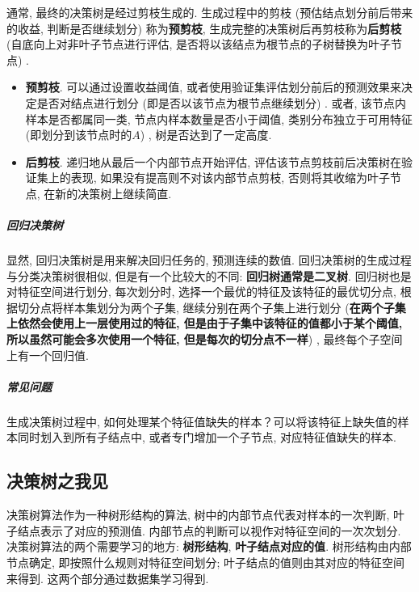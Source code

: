 
通常, 最终的决策树是经过剪枝生成的. 生成过程中的剪枝 (预估结点划分前后带来的收益, 判断是否继续划分) 称为\textbf{预剪枝}, 生成完整的决策树后再剪枝称为\textbf{后剪枝} (自底向上对非叶子节点进行评估, 是否将以该结点为根节点的子树替换为叶子节点) . 
\begin{itemize}
\item \textbf{预剪枝}. 可以通过设置收益阈值, 或者使用验证集评估划分前后的预测效果来决定是否对结点进行划分 (即是否以该节点为根节点继续划分) . 或者, 该节点内样本是否都属同一类, 节点内样本数量是否小于阈值, 类别分布独立于可用特征 (即划分到该节点时的$A$) , 树是否达到了一定高度. 
\item \textbf{后剪枝}. 递归地从最后一个内部节点开始评估, 评估该节点剪枝前后决策树在验证集上的表现, 如果没有提高则不对该内部节点剪枝, 否则将其收缩为叶子节点, 在新的决策树上继续简直. 
\end{itemize}

\subparagraph{回归决策树}显然, 回归决策树是用来解决回归任务的, 预测连续的数值. 回归决策树的生成过程与分类决策树很相似, 但是有一个比较大的不同: \textbf{回归树通常是二叉树}. 回归树也是对特征空间进行划分, 每次划分时, 选择一个最优的特征及该特征的最优切分点, 根据切分点将样本集划分为两个子集, 继续分别在两个子集上进行划分 (\textbf{在两个子集上依然会使用上一层使用过的特征, 但是由于子集中该特征的值都小于某个阈值, 所以虽然可能会多次使用一个特征, 但是每次的切分点不一样}) , 最终每个子空间上有一个回归值. 

\subparagraph{常见问题}
\begin{myenumerate}
\item 生成决策树过程中, 如何处理某个特征值缺失的样本？可以将该特征上缺失值的样本同时划入到所有子结点中, 或者专门增加一个子节点, 对应特征值缺失的样本. 
\item 
\end{myenumerate}


\subsection{决策树之我见}
决策树算法作为一种树形结构的算法, 树中的内部节点代表对样本的一次判断, 叶子结点表示了对应的预测值. 内部节点的判断可以视作对特征空间的一次次划分. 决策树算法的两个需要学习的地方: \textbf{树形结构}, \textbf{叶子结点对应的值}. 树形结构由内部节点确定, 即按照什么规则对特征空间划分; 叶子结点的值则由其对应的特征空间来得到. 这两个部分通过数据集学习得到. 

